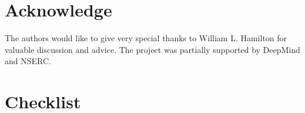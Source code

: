 \documentclass{article}
\newcommand{\0}{{\boldsymbol{0}}}
\newcommand{\6}{{\partial}}
\newcommand{\8}{{\infty}}
\newcommand{\4}{{\nabla}}
\begin{document}
\vspace{-0.3cm}
\section{Acknowledge}
\vspace{-0.2cm}
The authors would like to give very special thanks to William L. Hamilton for valuable discussion and advice. The project was partially supported by DeepMind and NSERC.


\iffalse
\section{Future Work}
\label{sec:futurework}
The similarity matrix and the new metrics defined in this paper mainly capture the linear relations of the aggregated node features. But this might be insufficient sometimes when nonlinearity information in feature vectors are important for classification. In the future, similarity matrix that is able to capture nonlinear relations between node features can be proposed to define new homophily metrics.



As the limitation raised in section \ref{sec:filterbank_acm_gnn_architecture}, filterbank method cannot properly handle all harmful cases of heterophily. In the future, we need to explore and address more challenging heterophilic graph with GNNs.
\fi
\clearpage




\clearpage

\section*{Checklist}
\end{document}
